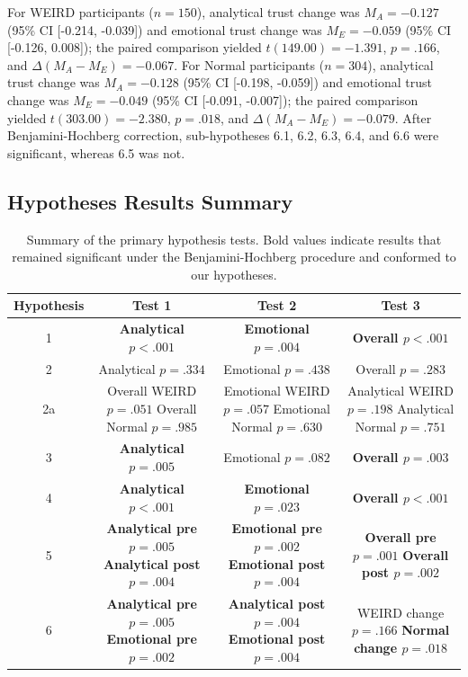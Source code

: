For WEIRD participants ($n=150$), analytical trust change was $M_{A}=-0.127$ (95\% CI [-0.214, -0.039]) and emotional trust change was $M_{E}=-0.059$ (95\% CI [-0.126, 0.008]); the paired comparison yielded $t(149.00)=-1.391$, $p = .166$, and $\Delta(M_A-M_E)=-0.067$. For Normal participants ($n=304$), analytical trust change was $M_{A}=-0.128$ (95\% CI [-0.198, -0.059]) and emotional trust change was $M_{E}=-0.049$ (95\% CI [-0.091, -0.007]); the paired comparison yielded $t(303.00)=-2.380$, $p = .018$, and $\Delta(M_A-M_E)=-0.079$. After Benjamini-Hochberg correction, sub-hypotheses 6.1, 6.2, 6.3, 6.4, and 6.6 were significant, whereas 6.5 was not.

\subsection{Hypotheses Results Summary}
\begin{table}[H]
  \centering
  \caption{Summary of the primary hypothesis tests. Bold values indicate results that remained significant under the Benjamini-Hochberg procedure and conformed to our hypotheses.}
  \label{tab:hypotheses-summary}
\begin{tabular}{||c c c c||} 
     \hline
     Hypothesis  & Test 1 & Test 2 & Test 3 \\ [0.5ex] 
     \hline\hline
     1 & \textbf{Analytical $p<.001$} & \textbf{Emotional $p=.004$} & \textbf{Overall $p<.001$}  \\ 
     \hline
     2 & Analytical $p=.334$ & Emotional $p=.438$ & Overall $p=.283$  \\
     \hline
     2a & \makecell{Overall WEIRD $p=.051$ \\ Overall Normal $p=.985$} & \makecell{Emotional WEIRD $p=.057$ \\ Emotional Normal $p=.630$} & \makecell{Analytical WEIRD $p=.198$ \\ Analytical Normal $p=.751$}  \\
     \hline
     3 & \textbf{Analytical $p=.005$} & Emotional $p=.082$ & \textbf{Overall $p=.003$}  \\
     \hline
    4 & \textbf{Analytical $p<.001$} & \textbf{Emotional $p=.023$} & \textbf{Overall $p<.001$}  \\
     \hline
     5 & \makecell{\textbf{Analytical pre $p=.005$} \\ \textbf{Analytical post $p=.004$}} & \makecell{\textbf{Emotional pre $p=.002$} \\ \textbf{Emotional post $p=.004$}} & \makecell{\textbf{Overall pre $p=.001$} \\ \textbf{Overall post $p=.002$}}  \\ 
     \hline
    6 & \makecell{\textbf{Analytical pre $p=.005$} \\ \textbf{Emotional pre $p=.002$}} & \makecell{\textbf{Analytical post $p=.004$} \\ \textbf{Emotional post $p=.004$}} & \makecell{WEIRD change $p=.166$ \\ \textbf{Normal change $p=.018$}}  \\ [1ex] 
     \hline
\end{tabular}
\end{table}
